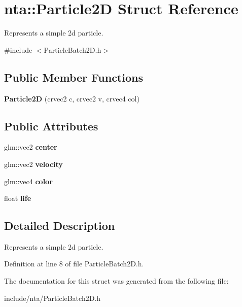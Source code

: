 \hypertarget{structnta_1_1Particle2D}{}\section{nta\+:\+:Particle2D Struct Reference}
\label{structnta_1_1Particle2D}


Represents a simple 2d particle.  




{\ttfamily \#include $<$Particle\+Batch2\+D.\+h$>$}

\subsection*{Public Member Functions}
\begin{DoxyCompactItemize}
\item 
\mbox{\label{structnta_1_1Particle2D_abfe29bfc0b8719eeb17df8268368ce52}} 
{\bfseries Particle2D} (crvec2 c, crvec2 v, crvec4 col)
\end{DoxyCompactItemize}
\subsection*{Public Attributes}
\begin{DoxyCompactItemize}
\item 
\mbox{\label{structnta_1_1Particle2D_a47ae411f47152a2b064dc216692302be}} 
glm\+::vec2 {\bfseries center}
\item 
\mbox{\label{structnta_1_1Particle2D_a7194c7ec065b7221ed61c861595cabb5}} 
glm\+::vec2 {\bfseries velocity}
\item 
\mbox{\label{structnta_1_1Particle2D_a3d3233a4de4f2c2b46715dd9a7187994}} 
glm\+::vec4 {\bfseries color}
\item 
\mbox{\label{structnta_1_1Particle2D_acfae159a4e2072f7896fac058e11e66f}} 
float {\bfseries life}
\end{DoxyCompactItemize}


\subsection{Detailed Description}
Represents a simple 2d particle. 

Definition at line 8 of file Particle\+Batch2\+D.\+h.



The documentation for this struct was generated from the following file\+:\begin{DoxyCompactItemize}
\item 
include/nta/Particle\+Batch2\+D.\+h\end{DoxyCompactItemize}

